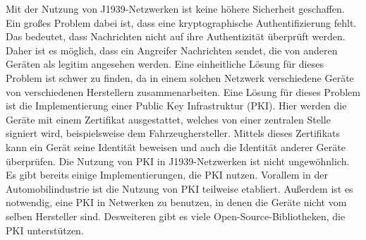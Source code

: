Mit der Nutzung von J1939-Netzwerken ist keine höhere Sicherheit geschaffen. Ein großes Problem dabei ist, dass
eine kryptographische Authentifizierung fehlt. Das bedeutet, dass Nachrichten nicht auf ihre Authentizität überprüft werden.
Daher ist es möglich, dass ein Angreifer Nachrichten sendet, die von anderen Geräten als legitim angesehen werden.
Eine einheitliche Lösung für dieses Problem ist schwer zu finden, da in einem solchen Netzwerk verschiedene Geräte
von verschiedenen Herstellern zusammenarbeiten. Eine Lösung für dieses Problem ist die Implementierung einer Public Key Infrastruktur (PKI).
Hier werden die Geräte mit einem Zertifikat ausgestattet, welches von einer zentralen Stelle signiert wird, beispielsweise
dem Fahrzeughersteller. Mittels dieses Zertifikats kann ein Gerät seine Identität beweisen und auch die Identität anderer Geräte
überprüfen. 
Die Nutzung von PKI in J1939-Netzwerken ist nicht ungewöhnlich. Es gibt bereits einige Implementierungen, die PKI nutzen.
Vorallem in der Automobilindustrie ist die Nutzung von PKI teilweise etabliert. Außerdem ist es notwendig, eine PKI in 
Netwerken zu benutzen, in denen die Geräte nicht vom selben Hersteller sind.
Desweiteren gibt es viele Open-Source-Bibliotheken,
die PKI unterstützen. 
\cite{Murvay2018} \\

